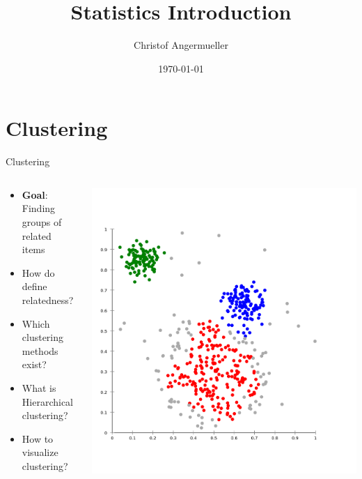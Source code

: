 \documentclass{beamer}\usepackage[]{graphicx}\usepackage[]{color}
\author{Christof Angermueller}
\title{Statistics Introduction}
\date{\today}
\begin{document}
\begin{frame}
  \titlepage
\end{frame}

\begin{frame}
  \tableofcontents
\end{frame}



\section{Clustering}
\begin{frame}
\tableofcontents[currentsection]
\end{frame}

\begin{frame}[fragile]{Clustering}
  \begin{columns}
    \begin{column}{.5\linewidth}
      \begin{itemize}
        \item \textbf{Goal}: Finding groups of related items
          \vspace{1cm}
        \item How do define relatedness?
        \item Which clustering methods exist?
        \item What is Hierarchical clustering?
        \item How to visualize clustering?
      \end{itemize}
    \end{column}
    \begin{column}{.5\linewidth}
      \begin{center}
        \includegraphics[width=.8\linewidth]{clust.png}
      \end{center}
    \end{column}
  \end{columns}
\end{frame}
\end{document}

